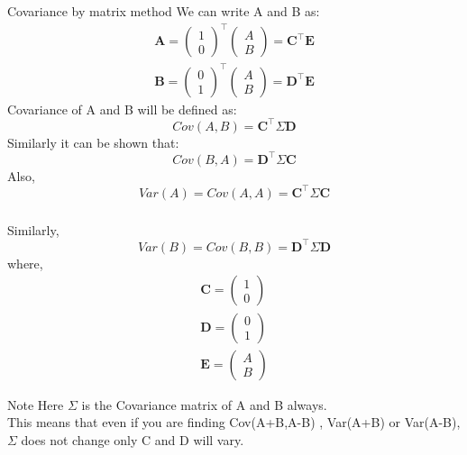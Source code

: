 \documentclass{beamer}
\renewcommand{\vec}[1]{\mathbf{#1}}
\newcommand{\myvec}[1]{\ensuremath{\begin{pmatrix}#1\end{pmatrix}}}
\begin{document}
\begin{frame}
    \frametitle{}
    \begin{block}{Covariance by matrix method}
        We can write A and B as:
        \begin{align}
            \vec{A} = \myvec{1 \\ 0}^\top \myvec{A \\ B} = \vec{C^\top} \vec{E} \\
            \vec{B} = \myvec{0 \\ 1}^\top \myvec{A \\ B} = \vec{D^\top} \vec{E}
        \end{align}
      Covariance of A and B will be defined as:
      \begin{equation}
          Cov(A,B) = \vec{C^\top} \Sigma \vec{D}
      \end{equation}
      Similarly it can be shown that:
      \begin{equation}
          Cov(B,A) = \vec{D^\top} \Sigma \vec{C}
      \end{equation}
      Also,
      \begin{equation}
         Var(A) = Cov(A,A) = \vec{C^\top} \Sigma \vec{C}
      \end{equation}
    \end{block}
\end{frame}

\begin{frame}
    \frametitle{}
    \begin{block}{}
    Similarly,
    \begin{equation}
         Var(B) = Cov(B,B) = \vec{D^\top} \Sigma \vec{D}
      \end{equation}
     where,
      \begin{align}
         \vec{C} = \myvec{1 \\ 0}\\
         \vec{D} = \myvec{0 \\ 1}\\
         \vec{E} = \myvec{A \\ B}
     \end{align}
    \end{block}
    \begin{block}{Note}
        Here $\Sigma$ is the Covariance matrix of A and B always.\\
        This means  that even if you are finding Cov(A+B,A-B) , Var(A+B) or Var(A-B), $\Sigma$ does not change only C and D will vary.
     \end{block}
\end{frame}
\end{document}
